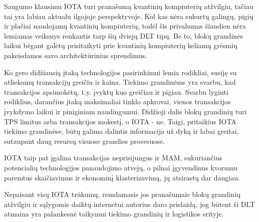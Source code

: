 Saugumo klausimu IOTA turi pranašumą kvantinių kompiuterių atžvilgiu, tačiau tai yra labiau aktualu ilgojoje perspektyvoje. Kol kas nėra sukurtų galingų, pigių ir plačiai naudojamų kvantinių kompiuterių, todėl šis privalumas šiandien nėra lemiamas veiksnys renkantis tarp šių dviejų DLT tipų. Be to, blokų grandinės laikui bėgant galėtų prisitaikyti prie kvantinių kompiuterių keliamų grėsmių pakeisdamos savo architektūrinius sprendimus.

Ko gero didžiausią įtaką technologijos pasirinkimui lemia rodikliai, susiję su atliekamų transakcijų greičiu ir kaina. Tiekimo grandinėms yra svarbu, kad transakcijos apsimokėtų, t.y. įvyktų kuo greičiau ir pigiau. Svarbu lyginti rodiklius, darančius įtaką maksimaliai tinklo apkrovai, vienos transakcijos įvykdymo laikui ir piniginiam naudingumui. Didžioji dalis blokų grandinių turi TPS limitus arba transakcijos mokestį, o IOTA - ne. Taigi, pritaikius IOTA tiekimo grandinėse, būtų galima dalintis informacija už dyką ir labai greitai, sutaupant daug resursų visuose grandies procesuose.

IOTA taip pat įgalina transakcijas neprisijungus ir MAM, sukuriančius potencialių technologijos panaudojimo atvejų, o pilnai įgyvendinus kvorumu paremtus skaičiavimus ir ekonominį klasterizavimą, jų atsirastų dar daugiau.

Nepaisant visų IOTA trūkumų, remdamasis jos pranašumais blokų grandinių atžvilgiu ir sąlygomis daiktų internetui autorius daro prielaidą, jog būtent ši DLT atmaina yra palankesnė taikymui tiekimo grandinių ir logistikos srityje. 